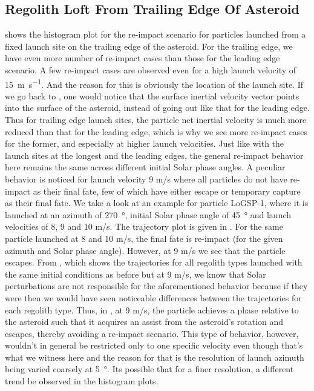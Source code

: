 \subsection{Regolith Loft From Trailing Edge Of Asteroid}
\label{sec:general_char_trailingEdge}
 shows the histogram plot for the re-impact scenario for particles launched from a fixed launch site on the trailing edge of the asteroid. For the trailing edge, we have even more number of re-impact cases than those for the leading edge scenario. A few re-impact cases are observed even for a high launch velocity of \SI{15}{\metre\per\second}. And the reason for this is obviously the location of the launch site. If we go back to , one would notice that the surface inertial velocity vector points into the surface of the asteroid, instead of going out like that for the leading edge. Thus for trailing edge launch sites, the particle net inertial velocity is much more reduced than that for the leading edge, which is why we see more re-impact cases for the former, and especially at higher launch velocities. Just like with the launch sites at the longest and the leading edges, the general re-impact behavior here remains the same across different initial Solar phase angles.
%
\newline\newline
%
A peculiar behavior is noticed for launch velocity 9 m/s where all particles do not have re-impact as their final fate, few of which have either escape or temporary capture as their final fate. We take a look at an example for particle LoGSP-1, where it is launched at an azimuth of \SI{270}{\degree}, initial Solar phase angle of \SI{45}{\degree} and launch velocities of 8, 9 and 10 m/s. The trajectory plot is given in . For the same particle launched at 8 and 10 m/s, the final fate is re-impact (for the given azimuth and Solar phase angle). However, at 9 m/s we see that the particle escapes. From , which shows the trajectories for all regolith types launched with the same initial conditions as before but at 9 m/s, we know that Solar perturbations are not responsible for the aforementioned behavior because if they were then we would have seen noticeable differences between the trajectories for each regolith type. Thus, in , at 9 m/s, the particle achieves a phase relative to the asteroid such that it acquires an assist from the asteroid's rotation and escapes, thereby avoiding a re-impact scenario. This type of behavior, however, wouldn't in general be restricted only to one specific velocity even though that's what we witness here and the reason for that is the resolution of launch azimuth being varied coarsely at \SI{5}{\degree}. Its possible that for a finer resolution, a different trend be observed in the histogram plots.
